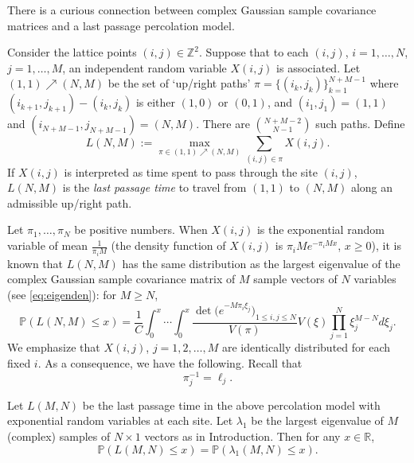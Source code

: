 \documentclass[11pt]{article}
\begin{document}
There is a curious connection between complex Gaussian sample
covariance matrices and a last passage percolation model.

Consider the lattice points $(i,j)\in \mathbb{Z}^2$. Suppose that
to each $(i,j)$, $i=1,\dots, N$, $j=1,\dots, M$, an independent
random variable $X(i,j)$ is associated. Let $(1,1) \nearrow (N,M)$
be the set of `up/right paths' $\pi=\{ (i_k, j_k)\}_{k=1}^{N+M-1}$
where $(i_{k+1},j_{k+1})-(i_k,j_k)$ is either $(1,0)$ or $(0,1)$,
and $(i_1,j_1)=(1,1)$ and $(i_{N+M-1}, j_{N+M-1})=(N,M)$. There
are $\binom{N+M-2}{N-1}$ such paths. Define
\begin{equation}\label{eq:lastppp}
  L(N,M) := \max_{\pi\in (1,1)\nearrow (N,M)} \sum_{(i,j) \in \pi}
  X(i,j).
\end{equation}
If $X(i,j)$ is interpreted as time spent to pass through the site
$(i,j)$, $L(N,M)$ is the \emph{last passage time} to travel from
$(1,1)$ to $(N,M)$ along an admissible up/right path.

Let $\pi_1, \dots, \pi_N$ be positive numbers. When $X(i,j)$ is the
exponential random variable of mean $\frac1{\pi_i M}$ (the density
function of $X(i,j)$ is $\pi_i M e^{-\pi_i M x}$, $x\ge 0$), it is
known that $L(N,M)$ has the same distribution as the largest
eigenvalue of the complex Gaussian sample covariance matrix of $M$
sample vectors of $N$ variables (see \eqref{eq:eigenden}): for
$M\ge N$,
\begin{equation}\label{eq:lastp}
  \mathbb{P}( L(N,M) \le x) = \frac1{C} \int_0^x \cdots \int_0^x
  \frac{\det\big( e^{-M\pi_i \xi_j} \bigr)_{1\le i,j\le
  N}}{V(\pi)} V(\xi) \prod_{j=1}^N \xi_j^{M-N} d\xi_j .
\end{equation}
We emphasize that $X(i,j)$, $j=1,2,\dots, M$ are identically distributed
for each fixed $i$. As a consequence, we have the following. Recall that
\begin{equation}
  \pi_j^{-1} = \ell_j.
\end{equation}


\begin{prop}
Let $L(M,N)$ be the last passage time in the above percolation model
with exponential random variables at each site. Let
$\lambda_1$ be the largest eigenvalue of $M$ (complex) samples of
$N\times 1$ vectors as in Introduction. Then for any $x\in \mathbb{R}$,
\begin{equation}
  \mathbb{P}(L(M,N)\le x) = \mathbb{P}(\lambda_1(M,N)\le x).
\end{equation}
\end{prop}
\end{document}
